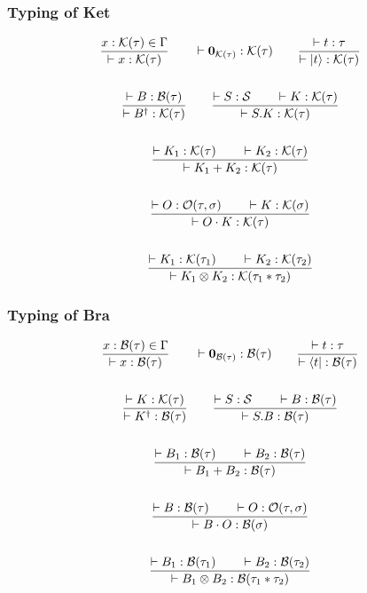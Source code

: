 \subsubsection*{Typing of Ket}
  \begin{gather*}
    \frac{x : \mathcal{K}(\tau) \in \Gamma}{\vdash x : \mathcal{K}(\tau)}
    \qquad
    \vdash \mathbf{0}_{\mathcal{K}(\tau)} : \mathcal{K}(\tau)
    \qquad
    \frac{\vdash t : \tau}{\vdash |t\rangle : \mathcal{K}(\tau)} \\
    \\
    \frac{\vdash B : \mathcal{B}(\tau)}{\vdash B^\dagger : \mathcal{K}(\tau)}
    \qquad
    \frac{\vdash S : \mathcal{S} \qquad \vdash K : \mathcal{K}(\tau)}{\vdash S.K : \mathcal{K}(\tau)} \\
    \\
    \frac{\vdash K_1 : \mathcal{K}(\tau) \qquad \vdash K_2 : \mathcal{K}(\tau)}{\vdash K_1 + K_2 : \mathcal{K}(\tau)} \\
    \\
    \frac{\vdash O : \mathcal{O}(\tau, \sigma) \qquad \vdash K : \mathcal{K}(\sigma)}{\vdash O \cdot K : \mathcal{K}(\tau)} \\
    \\
    \frac{\vdash K_1 : \mathcal{K}(\tau_1) \qquad \vdash K_2 : \mathcal{K}(\tau_2)}{\vdash K_1 \otimes K_2 : \mathcal{K}(\tau_1 * \tau_2)}
  \end{gather*}


\subsubsection*{Typing of Bra}
  \begin{gather*}
    \frac{x : \mathcal{B}(\tau) \in \Gamma}{\vdash x : \mathcal{B}(\tau)}
    \qquad
    \vdash \mathbf{0}_{\mathcal{B}(\tau)} : \mathcal{B}(\tau)
    \qquad
    \frac{\vdash t : \tau}{\vdash \langle t| : \mathcal{B}(\tau)} \\
    \\
    \frac{\vdash K : \mathcal{K}(\tau)}{\vdash K^\dagger : \mathcal{B}(\tau)}
    \qquad
    \frac{\vdash S : \mathcal{S} \qquad \vdash B : \mathcal{B}(\tau)}{\vdash S.B : \mathcal{B}(\tau)} \\
    \\
    \frac{\vdash B_1 : \mathcal{B}(\tau) \qquad \vdash B_2 : \mathcal{B}(\tau)}{\vdash B_1 + B_2 : \mathcal{B}(\tau)} \\
    \\
    \frac{\vdash B : \mathcal{B}(\tau) \qquad \vdash O : \mathcal{O}(\tau, \sigma)}{\vdash B \cdot O : \mathcal{B}(\sigma)} \\
    \\
    \frac{\vdash B_1 : \mathcal{B}(\tau_1) \qquad \vdash B_2 : \mathcal{B}(\tau_2)}{\vdash B_1 \otimes B_2 : \mathcal{B}(\tau_1 * \tau_2)}
  \end{gather*}


